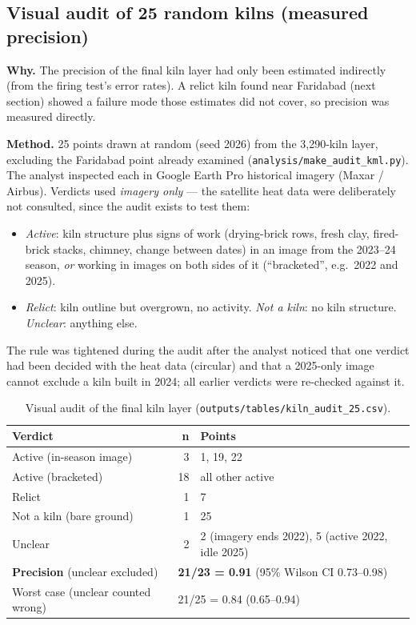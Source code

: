 \documentclass[11pt,a4paper]{article}
\begin{document}
\subsection{Visual audit of 25 random kilns (measured precision)}
\label{sec:audit}
\textbf{Why.} The precision of the final kiln layer had only been estimated
indirectly (from the firing test's error rates). A relict kiln found near
Faridabad (next section) showed a failure mode those estimates did not cover, so
precision was measured directly.

\textbf{Method.} 25 points drawn at random (seed 2026) from the 3{,}290-kiln
layer, excluding the Faridabad point already examined
(\texttt{analysis/make\_audit\_kml.py}). The analyst inspected each in Google
Earth Pro historical imagery (Maxar / Airbus). Verdicts used \emph{imagery only}
--- the satellite heat data were deliberately not consulted, since the audit
exists to test them:
\begin{itemize}[leftmargin=*]
\item \emph{Active}: kiln structure plus signs of work (drying-brick rows,
fresh clay, fired-brick stacks, chimney, change between dates) in an image from
the 2023--24 season, \emph{or} working in images on both sides of it
(``bracketed'', e.g.\ 2022 and 2025).
\item \emph{Relict}: kiln outline but overgrown, no activity. \emph{Not a
kiln}: no kiln structure. \emph{Unclear}: anything else.
\end{itemize}
The rule was tightened during the audit after the analyst noticed that one
verdict had been decided with the heat data (circular) and that a 2025-only image
cannot exclude a kiln built in 2024; all earlier verdicts were re-checked
against it.

\begin{table}[H]
\centering\small
\begin{tabular}{@{}lrl@{}}
\toprule
Verdict & n & Points \\
\midrule
Active (in-season image)   & 3  & 1, 19, 22 \\
Active (bracketed)         & 18 & all other active \\
Relict                     & 1  & 7 \\
Not a kiln (bare ground)   & 1  & 25 \\
Unclear                    & 2  & 2 (imagery ends 2022), 5 (active 2022, idle 2025) \\
\midrule
\textbf{Precision} (unclear excluded) & \multicolumn{2}{l}{\textbf{21/23 = 0.91} (95\% Wilson CI 0.73--0.98)} \\
Worst case (unclear counted wrong)    & \multicolumn{2}{l}{21/25 = 0.84 (0.65--0.94)} \\
\bottomrule
\end{tabular}
\caption{Visual audit of the final kiln layer
(\texttt{outputs/tables/kiln\_audit\_25.csv}).}
\end{table}
\end{document}
